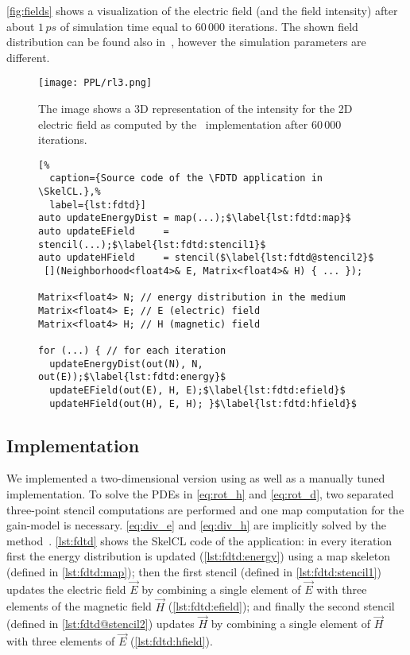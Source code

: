 \autoref{fig:fields} shows a visualization of the electric field (and the field intensity) after about  $1\,ps$ of simulation time equal to $60\,000$ iterations.
The shown field distribution can be found also in~\cite{Sebbah2002, Yamilov2005}, however the simulation parameters are different.

\begin{figure}[t]
    \centering
    \texttt{[image: PPL/rl3.png]}
    \caption[A 3D representation of the inensity of the 2D electric field as computed by the \SkelCL\ \FDTD implementation.]%
            {The image shows a 3D representation of the intensity for the 2D electric field as computed by the \SkelCL\ \FDTD implementation after $60\,000$ iterations.}
    \label{fig:fields}
\end{figure}

\begin{figure}[tbp]
\begin{lstlisting}[%
  caption={Source code of the \FDTD application in \SkelCL.},%
  label={lst:fdtd}]
auto updateEnergyDist = map(...);$\label{lst:fdtd:map}$
auto updateEField     = stencil(...);$\label{lst:fdtd:stencil1}$
auto updateHField     = stencil($\label{lst:fdtd@stencil2}$
 [](Neighborhood<float4>& E, Matrix<float4>& H) { ... });

Matrix<float4> N; // energy distribution in the medium
Matrix<float4> E; // E (electric) field
Matrix<float4> H; // H (magnetic) field

for (...) { // for each iteration
  updateEnergyDist(out(N), N, out(E));$\label{lst:fdtd:energy}$
  updateEField(out(E), H, E);$\label{lst:fdtd:efield}$
  updateHField(out(H), E, H); }$\label{lst:fdtd:hfield}$
\end{lstlisting}
\end{figure}

\subsection*{\SkelCL Implementation}

We implemented a two-dimensional version using \SkelCL as well as a manually tuned \OpenCL implementation.
To solve the PDEs in \autoref{eq:rot_h} and \autoref{eq:rot_d}, two separated three-point stencil computations are performed and one map computation for the gain-model is necessary.
\autoref{eq:div_e} and \autoref{eq:div_h} are implicitly solved by the \FDTD method~\cite{Yee1966}.
\autoref{lst:fdtd} shows the SkelCL code of the application:
in every iteration first the energy distribution is updated (\autoref{lst:fdtd:energy}) using a map skeleton (defined in \autoref{lst:fdtd:map});
then the first stencil (defined in \autoref{lst:fdtd:stencil1}) updates the electric field $\vec{E}$ by combining a single element of $\vec{E}$ with three elements of the magnetic field $\vec{H}$ (\autoref{lst:fdtd:efield});
and finally the second stencil (defined in \autoref{lst:fdtd@stencil2}) updates $\vec{H}$ by combining a single element of $\vec{H}$ with three elements of $\vec{E}$ (\autoref{lst:fdtd:hfield}).

